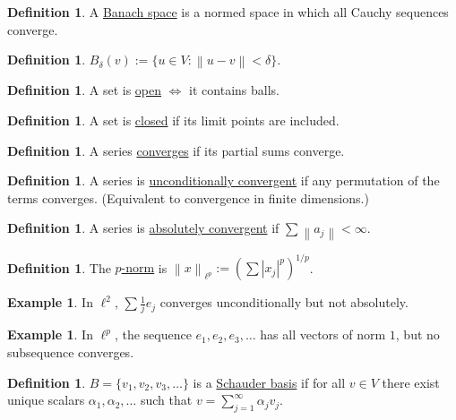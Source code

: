 \documentclass[12pt]{article}
\newcommand{\abs}[1]{\left| #1 \right|}
\newcommand{\norm}[1]{\left\| #1 \right\|}
\theoremstyle{definition}
\newtheorem{defn}[thm]{Definition}
\newtheorem{ex}[thm]{Example}
\begin{document}
\begin{defn}
	A \underline{Banach space} is a normed space in which all Cauchy sequences converge.
\end{defn}

\begin{defn}
	$B_\delta(v) := \lbrace u \in V : \norm{u - v} < \delta \rbrace$.
\end{defn}

\begin{defn}
	A set is \underline{open} $\iff$ it contains balls.
\end{defn}

\begin{defn}
	A set is \underline{closed} if its limit points are included.
\end{defn}

\begin{defn}
	A series \underline{converges} if its partial sums converge.
\end{defn}

\begin{defn}
	A series is \underline{unconditionally convergent} if any permutation of the terms converges.
	(Equivalent to convergence in finite dimensions.)
\end{defn}

\begin{defn}
	A series is \underline{absolutely convergent} if $\sum \norm{a_j} < \infty$.
\end{defn}

\begin{defn}
	The \underline{$p$-norm} is $\norm{x}_{\ell^p} := \left( \sum \abs{x_j}^p \right)^{1/p}$.
\end{defn}

\begin{ex}
	In $\ell^2$, $\sum \frac{1}{j} e_j$ converges unconditionally but not absolutely.
\end{ex}

\begin{ex}
	In $\ell^p$, the sequence $e_1, e_2, e_3, \dots$ has all vectors of norm $1$, but no subsequence converges.
\end{ex}

\begin{defn}
	$B = \lbrace v_1, v_2, v_3, \dots \rbrace$ is a \underline{Schauder basis} if for all $v \in V$ there exist unique scalars $\alpha_1, \alpha_2, \dots$ such that $v = \sum_{j=1}^\infty \alpha_j v_j$.
\end{defn}
\end{document}
